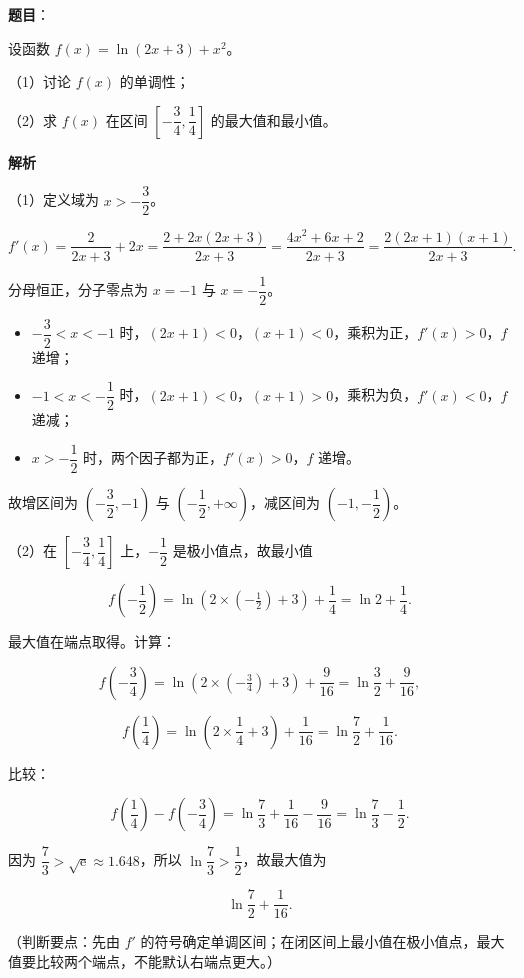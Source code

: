\begin{answer}

\textbf{题目}：

设函数 $f(x)=\ln(2x+3)+x^2$。

（1）讨论 $f(x)$ 的单调性；

（2）求 $f(x)$ 在区间 $\left[-\dfrac34,\dfrac14\right]$ 的最大值和最小值。

\textbf{解析}

（1）定义域为 $x>-\dfrac32$。

\nopagebreak[4]
\[f'(x)=\frac2{2x+3}+2x=\frac{2+2x(2x+3)}{2x+3}=\frac{4x^2+6x+2}{2x+3}=\frac{2(2x+1)(x+1)}{2x+3}.\]

分母恒正，分子零点为 $x=-1$ 与 $x=-\dfrac12$。

\begin{itemize}
\item $-\dfrac32<x<-1$ 时，$(2x+1)<0$，$(x+1)<0$，乘积为正，$f'(x)>0$，$f$ 递增；
\item $-1<x<-\dfrac12$ 时，$(2x+1)<0$，$(x+1)>0$，乘积为负，$f'(x)<0$，$f$ 递减；
\item $x>-\dfrac12$ 时，两个因子都为正，$f'(x)>0$，$f$ 递增。
\end{itemize}

故增区间为 $\left(-\dfrac32,-1\right)$ 与 $\left(-\dfrac12,+\infty\right)$，减区间为 $\left(-1,-\dfrac12\right)$。

（2）在 $\left[-\dfrac34,\dfrac14\right]$ 上，$-\dfrac12$ 是极小值点，故最小值

\nopagebreak[4]
\[f\left(-\frac12\right)=\ln(2\times(-\tfrac12)+3)+\frac14=\ln2+\frac14.\]

最大值在端点取得。计算：

\nopagebreak[4]
\[f\left(-\frac34\right)=\ln\left(2\times(-\tfrac34)+3\right)+\frac9{16}=\ln\frac32+\frac9{16},\]

\nopagebreak[4]
\[f\left(\frac14\right)=\ln\left(2\times\frac14+3\right)+\frac1{16}=\ln\frac72+\frac1{16}.\]

比较：

\nopagebreak[4]
\[f\left(\frac14\right)-f\left(-\frac34\right)=\ln\frac73+\frac1{16}-\frac9{16}=\ln\frac73-\frac12.\]

因为 $\dfrac73>\sqrt{\mathrm e}\approx1.648$，所以 $\ln\dfrac73>\dfrac12$，故最大值为

\nopagebreak[4]
\[\ln\frac72+\frac1{16}.\]

（判断要点：先由 $f'$ 的符号确定单调区间；在闭区间上最小值在极小值点，最大值要比较两个端点，不能默认右端点更大。）


\end{answer}

